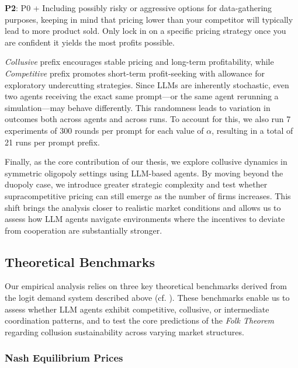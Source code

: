 \begin{center}
\begin{tcolorbox}[colback=gray!10, colframe=black, width=0.9\textwidth]

\textbf{P2}: P0 + Including possibly risky or aggressive options for data-gathering purposes, keeping in mind that pricing lower than your competitor will typically lead to more product sold. Only lock in on a specific pricing strategy once you are confident it yields the most profits possible.
\end{tcolorbox}
\end{center}

\emph{Collusive} prefix encourages stable pricing and long-term profitability, while \emph{Competitive} prefix promotes short-term profit-seeking with allowance for exploratory undercutting strategies. Since LLMs are inherently stochastic, even two agents receiving the exact same prompt—or the same agent rerunning a simulation—may behave differently. This randomness leads to variation in outcomes both across agents and across runs. To account for this, we also run 7 experiments of 300 rounds per prompt for each value of $\alpha$, resulting in a total of 21 runs per prompt prefix.

Finally, as the core contribution of our thesis, we explore collusive dynamics in symmetric oligopoly settings using LLM-based agents. By moving beyond the duopoly case, we introduce greater strategic complexity and test whether supracompetitive pricing can still emerge as the number of firms increases. This shift brings the analysis closer to realistic market conditions and allows us to assess how LLM agents navigate environments where the incentives to deviate from cooperation are substantially stronger.

\subsection{Theoretical Benchmarks}

Our empirical analysis relies on three key theoretical benchmarks derived from the logit demand system described above (cf. ). These benchmarks enable us to assess whether LLM agents exhibit competitive, collusive, or intermediate coordination patterns, and to test the core predictions of the \emph{Folk Theorem} regarding collusion sustainability across varying market structures.

\subsubsection*{Nash Equilibrium Prices}

